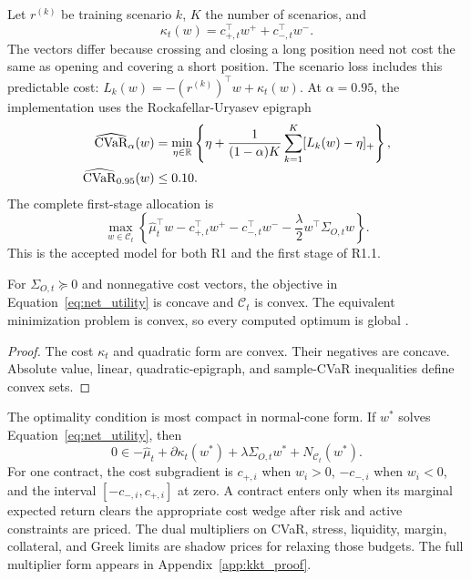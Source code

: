 Let \(r^{(k)}\) be training scenario \(k\), \(K\) the number of scenarios, and
\begin{equation}
  \kappa_t(w)=c_{+,t}^\top w^++c_{-,t}^\top w^-.
  \label{eq:asymmetric_cost}
\end{equation}
The vectors differ because crossing and closing a long position need not cost the same as
opening and covering a short position. The scenario loss includes this predictable cost:
\(L_k(w)=-(r^{(k)})^\top w+\kappa_t(w)\). At \(\alpha=0.95\), the implementation uses the
Rockafellar-Uryasev epigraph \citep{rockafellar_uryasev2000}
\begin{align}
  \widehat{\operatorname{CVaR}}_{\alpha}(w)
  &=\min_{\eta\in\mathbb{R}}\left\{\eta+
  \frac{1}{(1-\alpha)K}\sum_{k=1}^K[L_k(w)-\eta]_+\right\},
  \label{eq:cvar_epigraph}\\
  \widehat{\operatorname{CVaR}}_{0.95}(w)&\le0.10. \nonumber
\end{align}
The complete first-stage allocation is
\begin{equation}
  \max_{w\in\mathcal C_t}
  \left\{\widehat\mu_t^\top w-c_{+,t}^\top w^+
  -c_{-,t}^\top w^- -\frac{\lambda}{2}w^\top\Sigma_{O,t}w\right\}.
  \label{eq:net_utility}
\end{equation}
This is the accepted model for both R1 and the first stage of R1.1.

\begin{proposition}
For \(\Sigma_{O,t}\succeq0\) and nonnegative cost vectors, the objective in
Equation~\eqref{eq:net_utility} is concave and \(\mathcal C_t\) is convex. The equivalent
minimization problem is convex, so every computed optimum is global
\citep{boyd_vandenberghe2004}.
\end{proposition}
\begin{proof}
The cost \(\kappa_t\) and quadratic form are convex. Their negatives are concave. Absolute
value, linear, quadratic-epigraph, and sample-CVaR inequalities define convex sets.
\end{proof}

The optimality condition is most compact in normal-cone form. If \(w^*\) solves
Equation~\eqref{eq:net_utility}, then
\begin{equation}
  0\in-\widehat\mu_t+\partial\kappa_t(w^*)
  +\lambda\Sigma_{O,t}w^*+N_{\mathcal C_t}(w^*).
  \label{eq:kkt_subgradient}
\end{equation}
For one contract, the cost subgradient is \(c_{+,i}\) when \(w_i>0\),
\(-c_{-,i}\) when \(w_i<0\), and the interval \([-c_{-,i},c_{+,i}]\) at zero. A contract
enters only when its marginal expected return clears the appropriate cost wedge after
risk and active constraints are priced. The dual multipliers on CVaR, stress, liquidity,
margin, collateral, and Greek limits are shadow prices for relaxing those budgets. The
full multiplier form appears in Appendix~\ref{app:kkt_proof}.

